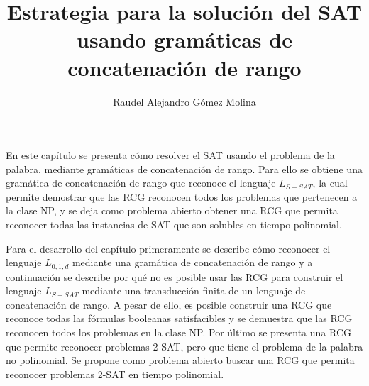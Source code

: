 \documentclass[12pt]{article}
\title{Estrategia para la solución del SAT usando gramáticas de concatenación de rango}
\author{Raudel Alejandro Gómez Molina}
\begin{document}
\maketitle





En este capítulo se presenta cómo resolver el SAT usando el problema de la palabra, mediante gramáticas de 
concatenación de rango. Para ello se obtiene una gramática de concatenación de rango que reconoce el lenguaje $L_{S-SAT}$, la cual permite demostrar que las RCG reconocen todos los problemas que pertenecen a la clase NP, y se deja como problema abierto obtener una RCG que permita reconocer todas las instancias de SAT que son solubles en tiempo polinomial.

Para el desarrollo del capítulo primeramente se describe cómo reconocer el lenguaje $L_{0,1,d}$ mediante una gramática de concatenación de rango y a continuación se describe por qué no es posible usar las RCG para construir el lenguaje $L_{S-SAT}$ mediante una transducción finita de un lenguaje de concatenación de rango. A pesar de ello, es posible construir una RCG que reconoce todas las fórmulas booleanas satisfacibles y se demuestra que las RCG reconocen todos los problemas en la clase NP. Por último se presenta una RCG que permite reconocer problemas 2-SAT, pero que tiene el problema de la palabra no polinomial. Se propone como problema abierto buscar una RCG que permita reconocer problemas 2-SAT en tiempo polinomial.
\end{document}
